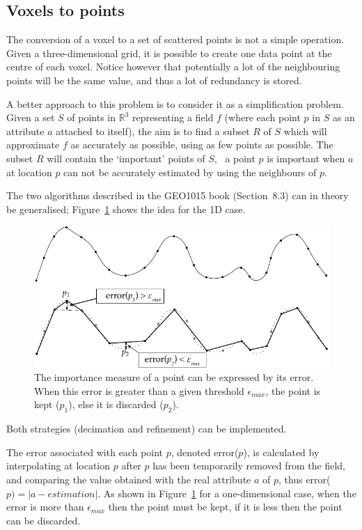 \subsection{Voxels to points}

The conversion of a voxel to a set of scattered points is not a simple operation.
Given a three-dimensional grid, it is possible to create one data point at the centre of each voxel.
Notice however that potentially a lot of the neighbouring points will be the same value, and thus a lot of redundancy is stored.

%

A better approach to this problem is to consider it as a simplification problem.
Given a set $S$ of points in $\mathbb{R}^3$ representing a field $f$ (where each point $p$ in $S$ as an attribute $a$ attached to itself), the aim is to find a subset $R$ of $S$ which will approximate $f$ as accurately as possible, using as few points as possible. 
The subset $R$ will contain the `important' points of $S$, \ie\ a point $p$ is important when $a$ at location $p$ can not be accurately estimated by using the neighbours of $p$.

%

The two algorithms described in the GEO1015 book (Section~8.3) can in theory be generalised; Figure~\ref{fig:meshsimplification} shows the idea for the 1D case.
\begin{figure}
  \centering
  \includegraphics[width=0.85\linewidth]{figs/mesh_simplification}
  \caption{The importance measure of a point can be expressed by its error. When this error is greater than a given threshold $\epsilon_{max}$, the point is kept ($p_1$), else it is discarded ($p_2$).}%
\label{fig:meshsimplification}
\end{figure}
Both strategies (decimation and refinement) can be implemented.

The error associated with each point $p$, denoted error($p$), is calculated by interpolating at location $p$ after $p$ has been temporarily removed from the field, and comparing the value obtained with the real attribute $a$ of $p$, thus error($p) = |a - estimation|$. 
As shown in Figure~\ref{fig:meshsimplification} for a one-dimensional case, when the error is more than $\epsilon_{max}$ then the point must be kept, if it is less then the point can be discarded.

